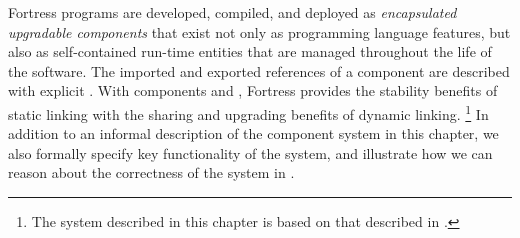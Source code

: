 %
%
%
%


Fortress programs
are developed, compiled, and deployed as
\emph{encapsulated upgradable components}
that exist not only as programming language features, but also as
self-contained run-time entities that are managed
throughout the life of the software.
The imported and exported references of a component
are described with explicit \emph{\apisN}.
With components and \apisN, Fortress
provides the stability benefits of
static linking with the sharing and upgrading benefits of
dynamic linking.
\footnote{The system described in this chapter is based on that
described in \cite{allen-05-components}.}
In addition to an informal description of the component system in this
chapter, we also formally specify key functionality of the system,
and illustrate how we can reason about the correctness of the system
in .
